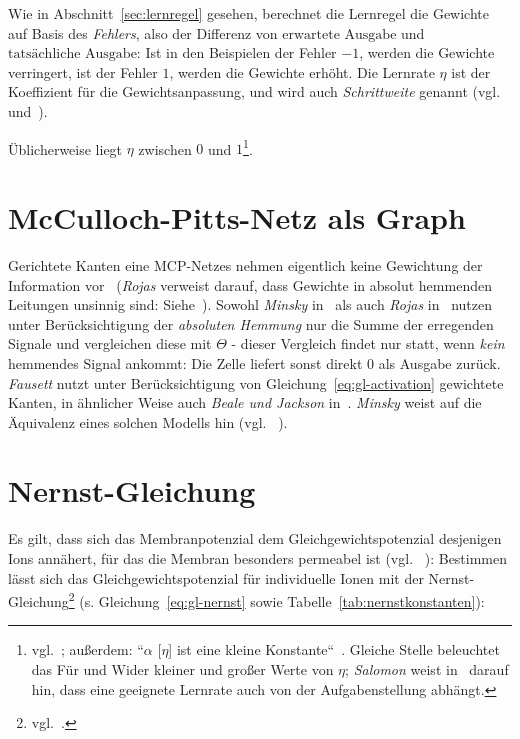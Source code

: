 Wie in Abschnitt~\ref{sec:lernregel} gesehen, berechnet die Lernregel die Gewichte auf Basis des \textit{Fehlers}, also der Differenz von $\text{erwartete Ausgabe}$ und $\text{tatsächliche Ausgabe}$: Ist in den Beispielen der Fehler $-1$, werden die Gewichte verringert, ist der Fehler $1$, werden die Gewichte erhöht.
Die Lernrate $\eta$ ist der Koeffizient für die Gewichtsanpassung, und wird auch \textit{Schrittweite} genannt (vgl.~\cite[93]{GBC18} und~\cite[172]{RN09}).

Üblicherweise liegt $\eta$ zwischen $0$ und $1$\footnote{
    vgl.~\cite[61]{Fau94}; außerdem: ``$\alpha$ [$\eta$] ist eine kleine Konstante``~\cite[172]{RN09}. Gleiche Stelle beleuchtet das Für und Wider kleiner und großer Werte von $\eta$; \textit{Salomon} weist in~\cite[173]{Sal90} darauf hin, dass eine geeignete Lernrate auch von der Aufgabenstellung abhängt.
}.


\section{McCulloch-Pitts-Netz als Graph}\label{appendix:mpc-graph}

Gerichtete Kanten eine MCP-Netzes nehmen eigentlich keine Gewichtung der Information vor~\cite[40]{Roj93} (\textit{Rojas} verweist darauf, dass Gewichte in absolut hemmenden Leitungen unsinnig sind: Siehe~\cite[42]{Roj93}). Sowohl \textit{Minsky} in~\cite[34]{Min67} als auch \textit{Rojas} in~\cite[32]{Roj93} nutzen unter Berücksichtigung der \textit{absoluten Hemmung} nur die Summe der erregenden Signale und vergleichen diese mit $\Theta$ - dieser Vergleich findet nur statt, wenn \textit{kein} hemmendes Signal ankommt: Die Zelle liefert sonst direkt $0$ als Ausgabe zurück. \textit{Fausett} nutzt unter Berücksichtigung von Gleichung~\ref{eq:gl-activation} gewichtete Kanten, in ähnlicher Weise auch \textit{Beale und Jackson} in~\cite[41]{BJ90}. \textit{Minsky} weist auf die Äquivalenz eines solchen Modells hin (vgl. ~\cite[34 f.]{Min67}).


\section{Nernst-Gleichung}\label{appendix:nernst-gleichung}
Es gilt, dass sich das Membranpotenzial dem Gleichgewichtspotenzial desjenigen Ions annähert, für das die Membran besonders permeabel ist (vgl. ~\cite[145 f.]{KSJ+13}): Bestimmen lässt sich das Gleichgewichtspotenzial für individuelle Ionen mit der Nernst-Gleichung\footnote{
    vgl.~\cite[67]{FE19}.
} (s. Gleichung~\ref{eq:gl-nernst} sowie Tabelle~\ref{tab:nernstkonstanten}):\\

